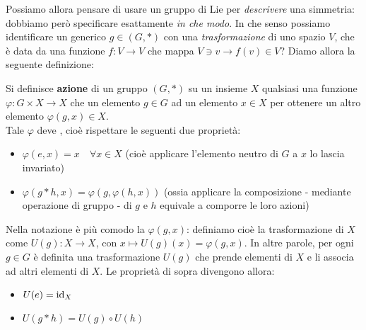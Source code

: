 \documentclass[../../FisicaTeorica.tex]{subfiles}
\begin{document}
Possiamo allora pensare di usare un gruppo di Lie per \textit{descrivere} una simmetria: dobbiamo però specificare esattamente \textit{in che modo}. In che senso possiamo identificare un generico $g \in (G,*)$ con una \textit{trasformazione} di uno spazio $V$, che è data da una funzione $f: V\to V$ che mappa $V \ni v \to f(v) \in V$? Diamo allora la seguente definizione:

\begin{dfn}
Si definisce \textbf{azione} di un gruppo $(G,*)$ su un insieme $X$ qualsiasi una funzione $\varphi: G\times X \to X$ che  un elemento $g \in G$ ad un elemento $x \in X$ per ottenere un altro elemento $\varphi(g,x) \in X$.\\
Tale $\varphi$ deve , cioè rispettare le seguenti due proprietà:
\begin{itemize}
\item $\varphi(e,x)=x \quad \forall x \in X$ (cioè applicare  l'elemento neutro di $G$ a $x$ lo lascia invariato)
\item $\varphi(g*h, x) = \varphi(g, \varphi(h,x))$ (ossia applicare la composizione - mediante operazione di gruppo - di $g$ e $h$ equivale a comporre le loro azioni)
\end{itemize}
Nella notazione è più comodo  la $\varphi(g,x)$: definiamo cioè la trasformazione di $X$ come $U(g): X \to X$, con $x \mapsto U(g)(x) = \varphi(g,x)$. In altre parole, per ogni $g\in G$ è definita una trasformazione $U(g)$ che prende elementi di $X$ e li associa ad altri elementi di $X$. Le proprietà di sopra divengono allora:
\begin{itemize}
\item $U(e) = \operatorname{id}_X$
\item $U(g*h) = U(g) \circ U(h)$
\end{itemize}

\end{dfn}
\end{document}
